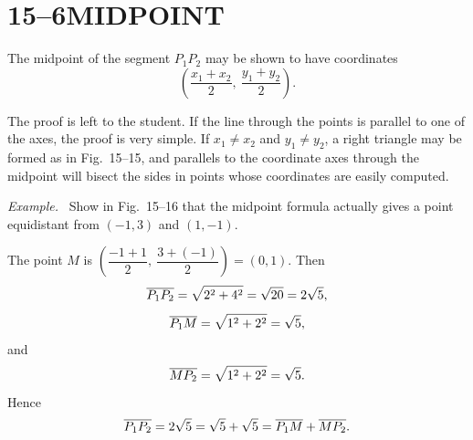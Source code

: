 \documentclass[11pt]{book}
\theoremstyle{bkplain}
\newenvironment{XVexample}[1][]{\par\medskip\noindent\emph{Example#1.}\ }{\par\medskip}
\begin{document}
\section*{15--6\quad MIDPOINT}

The midpoint of the segment $P_1P_2$ may be shown to have coordinates
\[
\left(\frac{x_1+x_2}{2},\ \frac{y_1+y_2}{2}\right).
\]

The proof is left to the student. If the line through the points is parallel
to one of the axes, the proof is very simple. If $x_1 \neq x_2$ and
$y_1 \neq y_2$, a right triangle may be formed as in Fig.~15--15, and
parallels to the coordinate axes through the midpoint will bisect the sides in
points whose coordinates are easily computed.

\begin{XVexample}
Show in Fig.~15--16 that the midpoint formula actually gives a point
equidistant from $(-1, 3)$ and $(1, -1)$.
\end{XVexample}

\FIGXVFIFTEENSIXTEEN

The point $M$ is
$\left(\dfrac{-1+1}{2},\ \dfrac{3+(-1)}{2}\right) = (0, 1)$. Then
\[
\overline{P_1P_2} = \sqrt{2^2 + 4^2} = \sqrt{20} = 2\sqrt{5},
\]
\[
\overline{P_1M} = \sqrt{1^2 + 2^2} = \sqrt{5},
\]
and
\[
\overline{MP_2} = \sqrt{1^2 + 2^2} = \sqrt{5}.
\]
Hence
\[
\overline{P_1P_2} = 2\sqrt{5} = \sqrt{5} + \sqrt{5} = \overline{P_1M} + \overline{MP_2}.
\]
\end{document}

